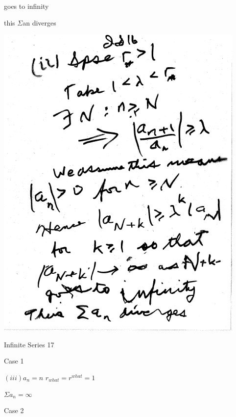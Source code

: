\documentclass[10pt,a4paper]{article}
\begin{document}
{{goes to infinity

this $\Sigma$an diverges

\begin{center}

\includegraphics[scale=1]{Pages/IS_16}

\end{center}

\newpage %

\begin{center}

Infinite Series 17

\end{center}

Case 1

\begin{center}

$(iii) a_{n} = n$ $r_{what} = r^{what} = 1$

$\Sigma a_{n} = \infty$ 

\end{center}

Case 2

\begin{center}


\end{center}}}
\end{document}
